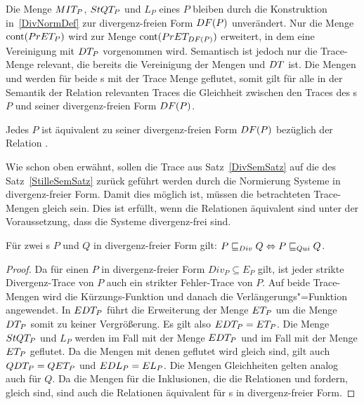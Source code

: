 Die Menge $MIT _P$, $StQT _P$ und $L_P$ eines \MEIO{} $P$ bleiben durch die
Konstruktion in~\ref{DivNormDef} zur divergenz-freien Form $DF (P)$
unverändert. Nur die Menge $\mathrm{cont} (PrET _P)$ wird zur Menge $\mathrm{cont} (PrET
_{DF (P)})$ erweitert, in dem eine Vereinigung mit $DT _P$ vorgenommen wird.
Semantisch ist jedoch nur die Trace-Menge \EDT{} relevant, die bereits die
Vereinigung der Mengen \ET{} und $DT{}$ ist. Die Mengen \QDT{} und \EDL{}
werden für beide \MEIO{}s mit der Trace Menge \EDT{} geflutet, somit gilt für
alle in der Semantik der Relation \DRel{} relevanten Traces die Gleichheit
zwischen den Traces des \MEIO{}s $P$ und seiner divergenz-freien Form $DF
(P)$.

\begin{Prop}
  \label{DivNormProp}
  Jedes \MEIO{} $P$ ist äquivalent zu seiner divergenz-freien Form $DF (P)$
  bezüglich der Relation \DRel{}.
\end{Prop}

Wie schon oben erwähnt, sollen die Trace aus Satz~\ref{DivSemSatz} auf die des
Satz~\ref{StilleSemSatz} zurück geführt werden durch die Normierung Systeme in
divergenz-freier Form. Damit dies möglich ist, müssen die betrachteten
Trace-Mengen gleich sein. Dies ist erfüllt, wenn die Relationen äquivalent sind
unter der Voraussetzung, dass die Systeme divergenz-frei sind.

\begin{Lem}
  Für zwei \MEIO{}s $P$ und $Q$ in divergenz-freier Form gilt: $P  \sqsubseteq  _{Div} Q
  \Leftrightarrow P  \sqsubseteq  _{Qui} Q$.
\end{Lem}
\begin{proof}
  Da für einen \MEIO{} $P$ in divergenz-freier Form $Div _P \subseteq E _P$
  gilt, ist jeder strikte Divergenz-Trace von $P$ auch ein strikter
  Fehler-Trace von $P$. Auf beide Trace-Mengen wird die Kürzungs-Funktion
  \prune{} und danach die Verlängerungs"=Funktion \cont{} angewendet. In $EDT
  _P$ führt die Erweiterung der Menge $ET _P$ um die Menge $DT _P$ somit zu
  keiner Vergrößerung. Es gilt also $EDT _P = ET _P$. Die Menge $StQT _P$
  und $L _P$ werden im Fall \DRel{} mit der Menge $EDT _P$ und im Fall \QRel{}
  mit der Menge $ET _P$ geflutet. Da die Mengen mit denen geflutet wird gleich
  sind, gilt auch $QDT _P = QET _P$ und $EDL _P = EL _P$. Die Mengen
  Gleichheiten gelten analog auch für $Q$. Da die Mengen für die Inklusionen,
  die die Relationen \DRel{} und \QRel{} fordern, gleich sind, sind auch die
  Relationen äquivalent für \MEIO{}s in divergenz-freier Form.
\end{proof}

